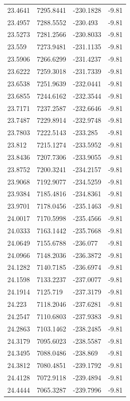 \begin{table}[H]
\begin{tabular}{llll}
23.4641 & 7295.8441 & -230.1828 & -9.81 \\
23.4957 & 7288.5552 & -230.493 & -9.81 \\
23.5273 & 7281.2566 & -230.8033 & -9.81 \\
23.559 & 7273.9481 & -231.1135 & -9.81 \\
23.5906 & 7266.6299 & -231.4237 & -9.81 \\
23.6222 & 7259.3018 & -231.7339 & -9.81 \\
23.6538 & 7251.9639 & -232.0441 & -9.81 \\
23.6855 & 7244.6162 & -232.3544 & -9.81 \\
23.7171 & 7237.2587 & -232.6646 & -9.81 \\
23.7487 & 7229.8914 & -232.9748 & -9.81 \\
23.7803 & 7222.5143 & -233.285 & -9.81 \\
23.812 & 7215.1274 & -233.5952 & -9.81 \\
23.8436 & 7207.7306 & -233.9055 & -9.81 \\
23.8752 & 7200.3241 & -234.2157 & -9.81 \\
23.9068 & 7192.9077 & -234.5259 & -9.81 \\
23.9384 & 7185.4816 & -234.8361 & -9.81 \\
23.9701 & 7178.0456 & -235.1463 & -9.81 \\
24.0017 & 7170.5998 & -235.4566 & -9.81 \\
24.0333 & 7163.1442 & -235.7668 & -9.81 \\
24.0649 & 7155.6788 & -236.077 & -9.81 \\
24.0966 & 7148.2036 & -236.3872 & -9.81 \\
24.1282 & 7140.7185 & -236.6974 & -9.81 \\
24.1598 & 7133.2237 & -237.0077 & -9.81 \\
24.1914 & 7125.719 & -237.3179 & -9.81 \\
24.223 & 7118.2046 & -237.6281 & -9.81 \\
24.2547 & 7110.6803 & -237.9383 & -9.81 \\
24.2863 & 7103.1462 & -238.2485 & -9.81 \\
24.3179 & 7095.6023 & -238.5587 & -9.81 \\
24.3495 & 7088.0486 & -238.869 & -9.81 \\
24.3812 & 7080.4851 & -239.1792 & -9.81 \\
24.4128 & 7072.9118 & -239.4894 & -9.81 \\
24.4444 & 7065.3287 & -239.7996 & -9.81 \\

\end{tabular}
\end{table}
